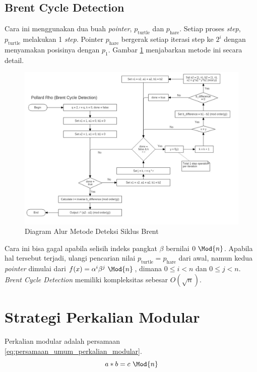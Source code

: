 \subsection{ Brent Cycle Detection}
Cara ini menggunakan dua buah \textit{pointer}, $ p_{\text{turtle}} $ dan $ p_{\text{hare}} $. Setiap proses \textit{step}, $ p_{\text{turtle}} $ melakukan 1 \textit{step}. Pointer $ p_{\text{hare}} $ bergerak setiap iterasi step ke $ 2^i $ dengan menyamakan posisinya dengan $ p_1 $. Gambar \ref{fig:brent_pollard_rho} menjabarkan metode ini secara detail.
\begin{figure}[h!]
	\Centering
	\includegraphics[scale=0.4,angle=90]{bab2/img/pollard-rho-brent}
	\caption {Diagram Alur Metode Deteksi Siklus Brent}
	\label{fig:brent_pollard_rho}
\end{figure}

Cara ini bisa gagal apabila selisih indeks pangkat $ \beta $ bernilai $ 0\ \Mod{n} $. Apabila hal tersebut terjadi, ulangi pencarian nilai $ p_{\text{turtle}} = p_{\text{hare}} $ dari awal, namun kedua \textit{pointer} dimulai dari $ f(x)=\alpha^i \beta^j\ \Mod{n} $, dimana $ 0 \leq i < n $ dan $ 0 \leq j < n $. \textit{Brent Cycle Detection} memiliki kompleksitas sebesar $ O(\sqrt{n}) $.

\section{ Strategi Perkalian Modular}

Perkalian modular adalah persamaan \eqref{eq:persamaan_umum_perkalian_modular}.
\begin{equation}
a*b=c\ \Mod{n}
\label{eq:persamaan_umum_perkalian_modular}
\end{equation}

